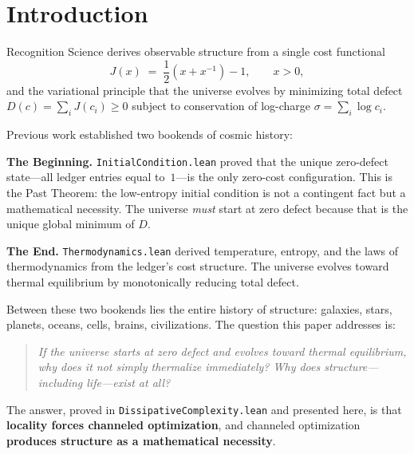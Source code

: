 \documentclass[11pt,a4paper]{article}
\theoremstyle{plain}
\theoremstyle{definition}
\theoremstyle{remark}
\newcommand{\Jcost}{J}
\begin{document}
\tableofcontents
\newpage

\section{Introduction}\label{sec:intro}

Recognition Science derives observable structure from a single cost functional
\begin{equation}\label{eq:jcost}
\Jcost(x) \;=\; \frac{1}{2}\!\left(x + x^{-1}\right) - 1, \qquad x > 0,
\end{equation}
and the variational principle that the universe evolves by minimizing total defect $D(c) = \sum_i \Jcost(c_i) \ge 0$ subject to conservation of log-charge $\sigma = \sum_i \log c_i$.

Previous work established two bookends of cosmic history:

\medskip
\noindent\textbf{The Beginning.}
\texttt{InitialCondition.lean} proved that the unique zero-defect state---all ledger entries equal to~$1$---is the only zero-cost configuration.
This is the Past Theorem: the low-entropy initial condition is not a contingent fact but a mathematical necessity.
The universe \emph{must} start at zero defect because that is the unique global minimum of $D$.

\medskip
\noindent\textbf{The End.}
\texttt{Thermodynamics.lean} derived temperature, entropy, and the laws of thermodynamics from the ledger's cost structure.
The universe evolves toward thermal equilibrium by monotonically reducing total defect.

\medskip
Between these two bookends lies the entire history of structure: galaxies, stars, planets, oceans, cells, brains, civilizations.
The question this paper addresses is:

\begin{quote}
\itshape
If the universe starts at zero defect and evolves toward thermal equilibrium, why does it not simply thermalize immediately?
Why does structure---including life---exist at all?
\end{quote}

The answer, proved in \texttt{DissipativeComplexity.lean} and presented here, is that \textbf{locality forces channeled optimization}, and channeled optimization \textbf{produces structure as a mathematical necessity}.

\end{document}
